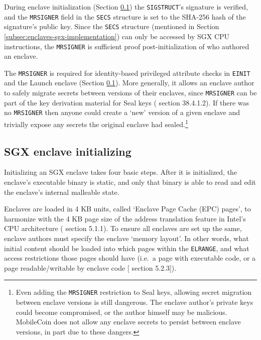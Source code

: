 During enclave initialization (Section \ref{subsec:enclaves-sgx-initializing}) the {\tt SIGSTRUCT}'s signature is verified, and the {\tt MRSIGNER} field in the {\tt SECS} structure is set to the SHA-256 hash of the signature's public key. Since the {\tt SECS} structure (mentioned in Section \ref{subsec:enclaves-sgx-implementation}) can only be accessed by SGX CPU instructions, the {\tt MRSIGNER} is sufficient proof post-initialization of who authored an enclave.

The {\tt MRSIGNER} is required for identity-based privileged attribute checks in {\tt EINIT} and the Launch enclave (Section \ref{subsec:enclaves-sgx-initializing}). More generally, it allows an enclave author to safely migrate secrets between versions of their enclaves, since {\tt MRSIGNER} can be part of the key derivation material for Seal keys (\cite{sgx-manual} section 38.4.1.2). If there was no {\tt MRSIGNER} then anyone could create a `new' version of a given enclave and trivially expose any secrets the original enclave had sealed.\footnote{\label{footnote:enclave-secret-migration-dangerous}Even adding the {\tt MRSIGNER} restriction to Seal keys, allowing secret migration between enclave versions is still dangerous. The enclave author's private keys could become compromised, or the author himself may be malicious. MobileCoin does not allow any enclave secrets to persist between enclave versions, in part due to these dangers.}%


\subsection{SGX enclave initializing}
\label{subsec:enclaves-sgx-initializing}

Initializing an SGX enclave takes four basic steps. After it is initialized, the enclave's executable binary is static, and only that binary is able to read and edit the enclave's internal malleable state.

Enclaves are loaded in 4 KB units, called `Enclave Page Cache (EPC) pages', to harmonize with the 4 KB page size of the address translation feature in Intel's CPU architecture (\cite{intel-sgx-explained-advanced} section 5.1.1). To ensure all enclaves are set up the same, enclave authors must specify the enclave `memory layout'. In other words, what initial content should be loaded into which pages within the {\tt ELRANGE}, and what access restrictions those pages should have (i.e.\ a page with executable code, or a page readable/writable by enclave code [\cite{intel-sgx-explained-advanced} section 5.2.3]).

